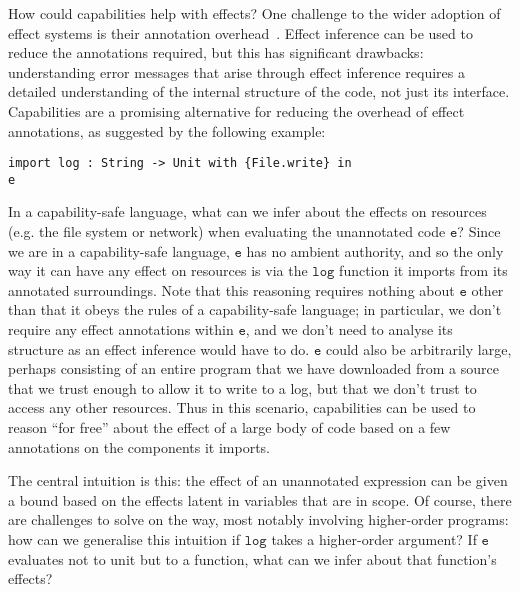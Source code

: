 \documentclass[sigplan,10pt,review]{acmart}\settopmatter{printfolios=true,printccs=false,printacmref=false}
\newcommand{\kwat}[1]{$\kwa{#1}$}
\newcommand{\kwa}[1]{\mathtt{#1}}
\newcommand{\epscalc}{\kwa{CC}}
\begin{document}
How could capabilities help with effects?
One challenge to the wider adoption of effect systems is their annotation overhead~\cite{rytz12}.
Effect inference can be used to reduce the annotations required, but this has significant drawbacks: understanding error messages that arise through effect inference requires a detailed understanding of the internal structure of the code, not just its interface.
Capabilities are a promising alternative for reducing the overhead of effect annotations, as suggested by the following example:

\begin{lstlisting}
import log : String -> Unit with {File.write} in
e
\end{lstlisting}

In a capability-safe language, what can we infer about the effects on resources (e.g. the file system or network) when evaluating the unannotated code \kwat{e}?
Since we are in a capability-safe language, \kwat{e} has no ambient authority, and so the only way it can have any effect on resources is via the \kwat{log} function it imports from its annotated surroundings.
Note that this reasoning requires nothing about \kwat{e} other than that it obeys the rules of a capability-safe language; in particular, we don't require any effect annotations within \kwat{e}, and we don't need to analyse its structure as an effect inference would have to do.
\kwat{e} could also be arbitrarily large, perhaps consisting of an entire program that we have downloaded from a source that we trust enough to allow it to write to a log, but that we don't trust to access any other resources.
Thus in this scenario, capabilities can be used to reason ``for free'' about the effect of a large body of code based on a few annotations on the components it imports.

The central intuition is this: the effect of an unannotated expression can be given a bound based on the effects latent in variables that are in scope.
Of course, there are challenges to solve on the way, most notably involving higher-order programs: how can we generalise this intuition if \kwat{log} takes a higher-order argument?
If \kwat{e} evaluates not to unit but to a function, what can we infer about that function's effects?

%
\end{document}
